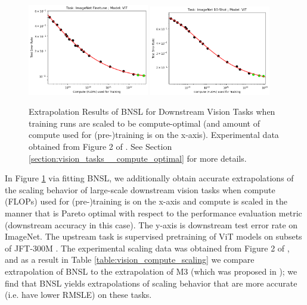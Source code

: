 \documentclass{article} %
\begin{document}
\begin{figure}[htbp]
    \centering
\includegraphics[width=0.471\textwidth]{figures/compute/vision/Task_ImageNet_Finetune__Model_ViT__BNSL.png}
\includegraphics[width=0.471\textwidth]{figures/compute/vision/Task_ImageNet_10-Shot__Model_ViT__BNSL.png}
\vspace{-4.2mm}
    \caption{
Extrapolation Results of BNSL for Downstream Vision Tasks when training runs are scaled to be compute-optimal (and amount of compute used for (pre-)training is on the x-axis). Experimental data obtained from Figure 2 of \cite{DBLP:journals/corr/abs-2106-04560}. See Section \ref{section:vision_tasks__compute_optimal} for more details.
    }
    \label{fig:vision_compute_scaling}
\end{figure}

\vspace{-0.6mm}

In Figure \ref{fig:vision_compute_scaling} via fitting BNSL, we additionally obtain accurate extrapolations of the scaling behavior of large-scale downstream vision tasks when compute (FLOPs) used for (pre-)training is on the x-axis and compute is scaled in the manner that is Pareto optimal with respect to the performance evaluation metric (downstream accuracy in this case). The y-axis is downstream test error rate on ImageNet. The upstream task is supervised pretraining of ViT \citep{dosovitskiy2020image} models on subsets of JFT-300M \citep{sun2017revisiting}. The experimental scaling data was obtained from Figure 2 of \cite{DBLP:journals/corr/abs-2106-04560}, and as a result in Table \ref{table:vision_compute_scaling} we compare extrapolation of BNSL to the extrapolation of M3 (which was proposed in \cite{DBLP:journals/corr/abs-2106-04560}); we find that BNSL yields extrapolations of scaling behavior that are more accurate (i.e. have lower RMSLE) on these tasks.
\end{document}
